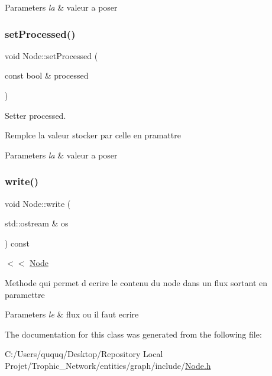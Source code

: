 \begin{DoxyParams}{Parameters}
{\em la} & valeur a poser \\
\hline
\end{DoxyParams}
\mbox{\label{class_node_a711384cef3ba7e7927bdad163ef66c26}} 
\subsubsection{\texorpdfstring{set\+Processed()}{setProcessed()}}
{\footnotesize\ttfamily void Node\+::set\+Processed (\begin{DoxyParamCaption}\item[{const bool \&}]{processed }\end{DoxyParamCaption})}



Setter processed. 

Remplce la valeur stocker par celle en pramattre


\begin{DoxyParams}{Parameters}
{\em la} & valeur a poser \\
\hline
\end{DoxyParams}
\mbox{\label{class_node_a01967a39cb1b94b4132715443bf31b69}} 
\subsubsection{\texorpdfstring{write()}{write()}}
{\footnotesize\ttfamily void Node\+::write (\begin{DoxyParamCaption}\item[{std\+::ostream \&}]{os }\end{DoxyParamCaption}) const}



$<$$<$ \mbox{\hyperlink{class_node}{Node}} 

Methode qui permet d ecrire le contenu du node dans un flux sortant en paramettre


\begin{DoxyParams}{Parameters}
{\em le} & flux ou il faut ecrire \\
\hline
\end{DoxyParams}


The documentation for this class was generated from the following file\+:\begin{DoxyCompactItemize}
\item 
C\+:/\+Users/ququq/\+Desktop/\+Repository Local Projet/\+Trophic\+\_\+\+Network/entities/graph/include/\mbox{\hyperlink{_node_8h}{Node.\+h}}\end{DoxyCompactItemize}
